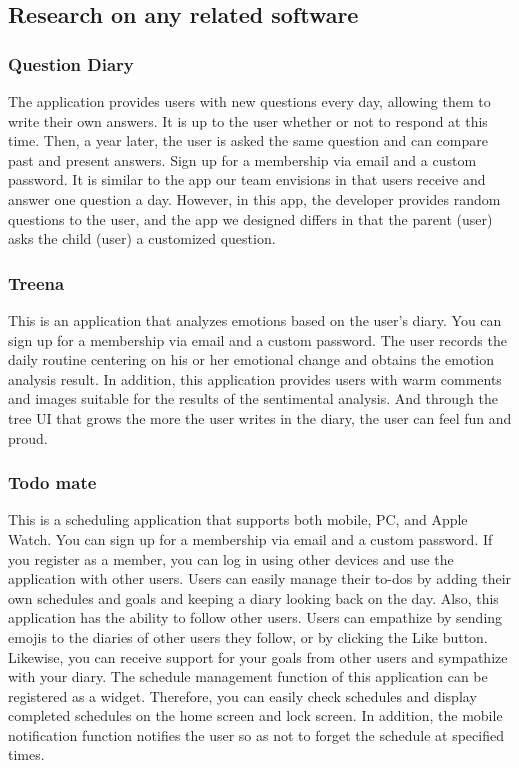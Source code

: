 \documentclass[conference]{IEEEtran}
\begin{document}
\subsection{Research on any related software}

\subsubsection{Question Diary}

The application provides users with new questions every day, allowing them to write their own answers. It is up to the user whether or not to respond at this time. Then, a year later, the user is asked the same question and can compare past and present answers. Sign up for a membership via email and a custom password. It is similar to the app our team envisions in that users receive and answer one question a day. However, in this app, the developer provides random questions to the user, and the app we designed differs in that the parent (user) asks the child (user) a customized question.

\subsubsection{Treena}

This is an application that analyzes emotions based on the user's diary. You can sign up for a membership via email and a custom password. The user records the daily routine centering on his or her emotional change and obtains the emotion analysis result. In addition, this application provides users with warm comments and images suitable for the results of the sentimental analysis. And through the tree UI that grows the more the user writes in the diary, the user can feel fun and proud.

\subsubsection{Todo mate}

This is a scheduling application that supports both mobile, PC, and Apple Watch. You can sign up for a membership via email and a custom password. If you register as a member, you can log in using other devices and use the application with other users. Users can easily manage their to-dos by adding their own schedules and goals and keeping a diary looking back on the day. Also, this application has the ability to follow other users. Users can empathize by sending emojis to the diaries of other users they follow, or by clicking the Like button. Likewise, you can receive support for your goals from other users and sympathize with your diary. The schedule management function of this application can be registered as a widget. Therefore, you can easily check schedules and display completed schedules on the home screen and lock screen. In addition, the mobile notification function notifies the user so as not to forget the schedule at specified times.
\end{document}
